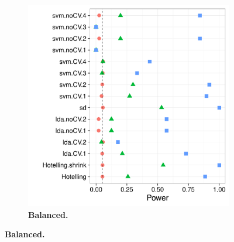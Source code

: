 \documentclass[12pt,a4paper]{article}
\theoremstyle{definition}
\begin{document}
\begin{figure}[h]
\begin{subfigure}{.5\textwidth}
		\includegraphics[width=1\linewidth]{"art/2016-07-27 11:42:05"}
		\caption{\textbf{Balanced.}} %
		\label{fig:simulation_12}
	\end{subfigure}
\end{figure}
\end{document}
